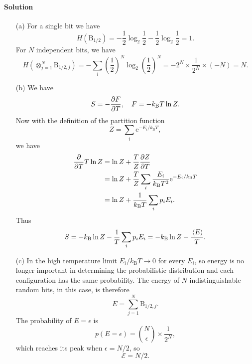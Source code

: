 \documentclass[hyperref, a4paper]{article}
\newcommand*{\ee}{\mathrm{e}}
\begin{document}
\paragraph{Solution} \begin{itemize}
\item[(a)] For a single bit we have 
\begin{equation}
    H(\mathrm{B}_{1/2}) = - \frac{1}{2} \log_2 \frac{1}{2} - \frac{1}{2} \log_2 \frac{1}{2} = 1.
\end{equation}
For $N$ independent bits,
we have 
\begin{equation}
    H(\otimes_{j=1}^N \mathrm{B}_{1/2, j}) = - \sum_{i} \left(\frac{1}{2}\right)^N \log_2 \left(\frac{1}{2}\right)^N = - 2^N \times \frac{1}{2^N} \times (- N) = N.
\end{equation}

\item[(b)] We have 
\[
    S = - \pdv{F}{T}, \quad F = - k _{\text{B}} T \ln Z.
\]
Now with the definition of the partition function 
\begin{equation}
    Z = \sum_i \ee^{- E_i / k_{\text{B}} T},
\end{equation}
we have 
\[
    \begin{aligned}
        \pdv{T} T \ln Z &= \ln Z + \frac{T}{Z} \pdv{Z}{T} \\
        &= \ln Z + \frac{T}{Z} \sum_i \frac{E_i}{k_{\text{B}} T^2} \ee^{- E_i / k_{\text{B}} T} \\
        &= \ln Z + \frac{1}{k_{\text{B}} T} \sum_i p_i E_i.
    \end{aligned}
\]
Thus 
\begin{equation}
    S = - k_{\text{B}} \ln Z - \frac{1}{T} \sum_i p_i E_i = - k_{\text{B}} \ln Z - \frac{\expval*{E}}{T}.
\end{equation}

\item[(c)] In the high temperature limit $E_i / k_{\text{B}} T \to 0$ for every $E_{i}$,
so energy is no longer important in determining the probabilistic distribution 
and each configuration has the same probability.
The energy of $N$ indistinguishable random bits, in this case, is therefore 
\begin{equation}
    E = \sum_{j=1}^N \mathrm{B}_{1/2, j}.
\end{equation}
The probability of $E = \epsilon$ is 
\begin{equation}
    p(E = \epsilon) = \binom{N}{\epsilon} \times \frac{1}{2^N},
\end{equation}
which reaches its peak when $\epsilon = N / 2$,
so 
\begin{equation}
    \mathcal{E} = N / 2.
\end{equation}


\end{itemize}
\end{document}
